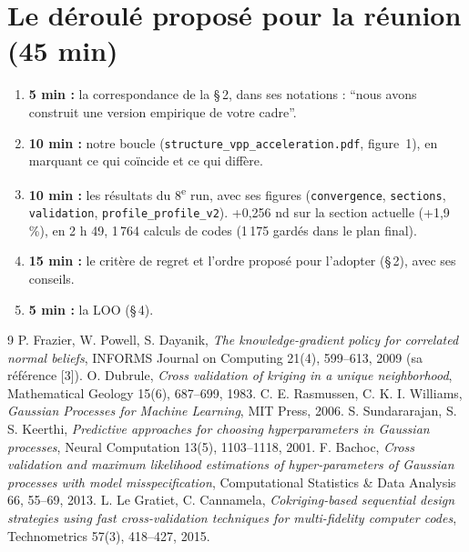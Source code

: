 \documentclass[11pt,a4paper]{article}
\newcommand{\py}[1]{\texttt{#1}}
\begin{document}
\section{Le déroulé proposé pour la réunion (45 min)}
\begin{enumerate}
  \item \textbf{5 min :} la correspondance de la §\,2, dans ses notations : \enquote{nous avons construit une
        version empirique de votre cadre}.
  \item \textbf{10 min :} notre boucle (\py{structure\_vpp\_acceleration.pdf}, figure~1), en marquant ce qui
        coïncide et ce qui diffère.
  \item \textbf{10 min :} les résultats du 8\textsuperscript{e} run, avec ses figures (\py{convergence},
        \py{sections}, \py{validation}, \py{profile\_profile\_v2}). +0,256 nd sur la section actuelle
        (+1,9 \%), en 2 h 49, 1\,764 calculs de codes (1\,175 gardés dans le plan final).
  \item \textbf{15 min :} le critère de regret et l'ordre proposé pour l'adopter (§\,2), avec ses conseils.
  \item \textbf{5 min :} la LOO (§\,4).
\end{enumerate}

\begin{thebibliography}{9}\footnotesize\setlength{\itemsep}{0pt}
 P. Frazier, W. Powell, S. Dayanik, \emph{The knowledge-gradient policy for correlated normal
beliefs}, INFORMS Journal on Computing 21(4), 599–613, 2009 (sa référence [3]).
 O. Dubrule, \emph{Cross validation of kriging in a unique neighborhood}, Mathematical Geology
15(6), 687–699, 1983.
 C. E. Rasmussen, C. K. I. Williams, \emph{Gaussian Processes for Machine Learning}, MIT Press,
2006.
 S. Sundararajan, S. S. Keerthi, \emph{Predictive approaches for choosing hyperparameters in
Gaussian processes}, Neural Computation 13(5), 1103–1118, 2001.
 F. Bachoc, \emph{Cross validation and maximum likelihood estimations of hyper-parameters of
Gaussian processes with model misspecification}, Computational Statistics \& Data Analysis 66, 55–69, 2013.
 L. Le Gratiet, C. Cannamela, \emph{Cokriging-based sequential design strategies using fast
cross-validation techniques for multi-fidelity computer codes}, Technometrics 57(3), 418–427, 2015.
\end{thebibliography}
\end{document}
